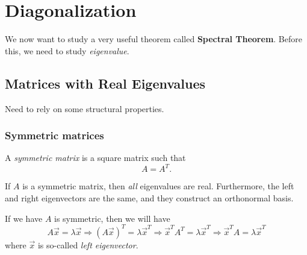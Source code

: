\chapter{Diagonalization}
We now want to study a very useful theorem called \textbf{Spectral Theorem}. Before this, we need to study \emph{eigenvalue}.
\section{Matrices with Real Eigenvalues}
Need to rely on some structural properties.

\subsection{Symmetric matrices}
\begin{definition}
	A \emph{symmetric matrix} is a square matrix such that
	\[
		A = A^{T}.
	\]
\end{definition}

\begin{theorem}\label{thm:spectral-theorem}
	If $A$ is a symmetric matrix, then \emph{all} eigenvalues are real. Furthermore, the left and right
	eigenvectors are the same, and they construct an orthonormal basis.
\end{theorem}

\begin{definition}
	If we have $A$ is symmetric, then we will have
	\[
		A \vec{x} = \lambda \vec{x}\Rightarrow
		(A \vec{x})^T = \lambda \vec{x}^T\Rightarrow
		\vec{x}^T A^T = \lambda\vec{x}^T\Rightarrow
		\vec{x}^T A = \lambda\vec{x}^T
	\]
	where $\vec{x}$ is so-called \emph{left eigenvector}.
\end{definition}

